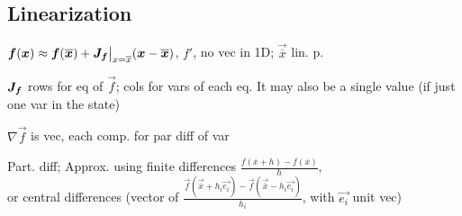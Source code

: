 \subsection{Linearization}
\label{sec:ms-lin}
$\bm{f}(\bm{x}) \approx \bm{f}(\bm{\overline{x}}) + \bm{J}_{\bm{f}} \big|_{x = \overline{x}}(\bm{x} - \bm{\overline{x}})$, $f'$, no vec in 1D; $\vec{\overline{x}}$ lin. p.

\shortdefinition[Jacobian] $\bm{J}_{\bm{f}}$ rows for eq of $\vec{f}$; cols for vars of each eq.
It may also be a single value (if just one var in the state)

\shortdefinition[Gradient] $\nabla \vec{f}$ is vec, each comp. for par diff of var

Part. diff; Approx. using finite differences $\frac{f(\overline{x} + h) - f(\overline{x})}{h}$,\\
or central differences (vector of $\frac{\vec{f}(\vec{\overline{x}} + h_i \vec{e_i}) - \vec{f}(\vec{\bar{x}} - h_i \vec{e_i})}{h_i}$, with $\vec{e_i}$ unit vec)

